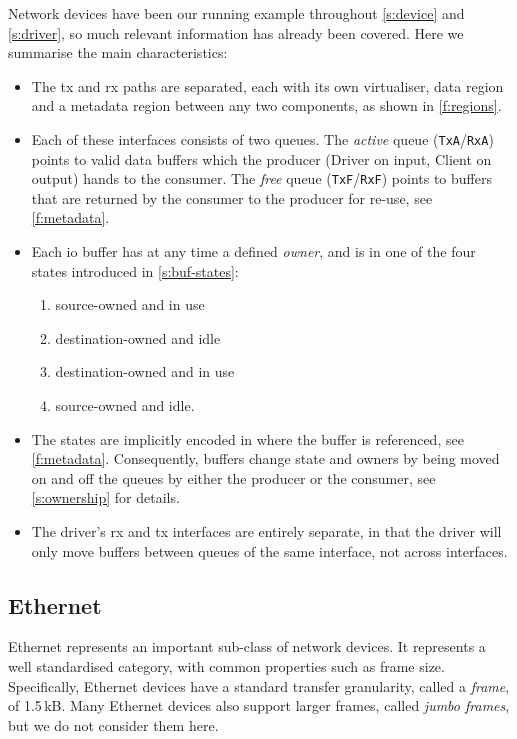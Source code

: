 \documentclass[a4paper,12pt]{report}
\newcommand{\code}[1]{\texttt{#1}}
\begin{document}
Network devices have been our running example throughout
\autoref{s:device} and \autoref{s:driver}, so much relevant
information has already been covered. Here we summarise the main
characteristics:
\begin{itemize}
\item The  \gls{tx} and  \gls{rx} paths are separated, each with its own
  virtualiser, data region and a metadata region between any two components, as shown in \autoref{f:regions}.
\item Each of these interfaces consists of two queues. The
  \emph{active} queue (\code{TxA}/\code{RxA}) points to valid data
  buffers which the producer (Driver on input, Client on output) hands
  to the consumer.  The \emph{free} queue (\code{TxF}/\code{RxF})
  points to buffers that are returned by the consumer to the producer
  for re-use, see \autoref{f:metadata}.
\item Each \gls{io} buffer has at any time a defined \emph{owner}, and is in
  one of the four states introduced in \autoref{s:buf-states}:
  \begin{enumerate}
  \item source-owned and in use
  \item destination-owned and idle
  \item destination-owned and in use
  \item source-owned and idle.
  \end{enumerate}
\item The states are implicitly encoded in where the buffer is referenced,
  see \autoref{f:metadata}. Consequently, buffers
  change state and owners by being moved on and off the queues by
  either the producer or the consumer, see \autoref{s:ownership} for details.
\item The driver's \gls{rx} and \gls{tx} interfaces are entirely separate, in that the driver
  will only move buffers between queues of the same interface, not
  across interfaces.
\end{itemize}

\subsection{Ethernet}\label{s:cl-en}

Ethernet represents an important sub-class of network devices.
It represents a well standardised category, with common properties
such as frame size. Specifically, Ethernet devices have a standard
transfer granularity, called a \emph{frame}, of 1.5\,kB. Many Ethernet
devices also support larger frames, called \emph{jumbo frames}, but we
do not consider them here.
\end{document}
